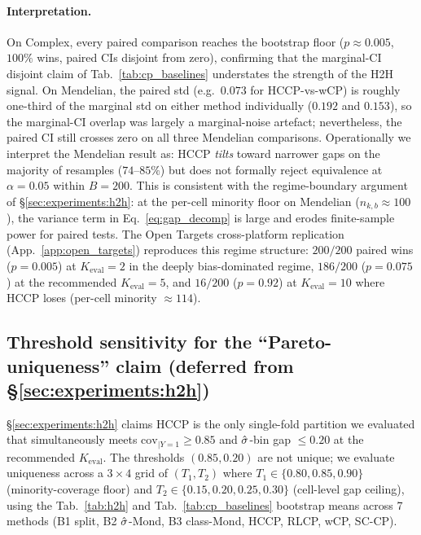\paragraph{Interpretation.} On Complex, every paired comparison reaches the bootstrap floor ($p \approx 0.005$, $100\%$ wins, paired CIs disjoint from zero), confirming that the marginal-CI disjoint claim of Tab.~\ref{tab:cp_baselines} understates the strength of the H2H signal. On Mendelian, the paired std (e.g.\ $0.073$ for HCCP-vs-wCP) is roughly one-third of the marginal std on either method individually ($0.192$ and $0.153$), so the marginal-CI overlap was largely a marginal-noise artefact; nevertheless, the paired CI still crosses zero on all three Mendelian comparisons. Operationally we interpret the Mendelian result as: HCCP \emph{tilts} toward narrower gaps on the majority of resamples ($74$--$85\%$) but does not formally reject equivalence at $\alpha = 0.05$ within $B = 200$. This is consistent with the regime-boundary argument of \S\ref{sec:experiments:h2h}: at the per-cell minority floor on Mendelian ($n_{k,b} \approx 100$), the variance term in Eq.~\eqref{eq:gap_decomp} is large and erodes finite-sample power for paired tests. The Open Targets cross-platform replication (App.~\ref{app:open_targets}) reproduces this regime structure: $200/200$ paired wins ($p = 0.005$) at $K_{\mathrm{eval}} = 2$ in the deeply bias-dominated regime, $186/200$ ($p = 0.075$) at the recommended $K_{\mathrm{eval}} = 5$, and $16/200$ ($p = 0.92$) at $K_{\mathrm{eval}} = 10$ where HCCP loses (per-cell minority $\approx 114$).

\subsection{Threshold sensitivity for the ``Pareto-uniqueness'' claim (deferred from \S\ref{sec:experiments:h2h})}
\label{app:tables:threshold_sensitivity}

\S\ref{sec:experiments:h2h} claims HCCP is the only single-fold partition we evaluated that simultaneously meets $\mathrm{cov}_{|Y=1} \geq 0.85$ and $\hat{\sigma}$-bin gap $\leq 0.20$ at the recommended $K_{\mathrm{eval}}$. The thresholds $(0.85, 0.20)$ are not unique; we evaluate uniqueness across a $3 \times 4$ grid of $(T_1, T_2)$ where $T_1 \in \{0.80, 0.85, 0.90\}$ (minority-coverage floor) and $T_2 \in \{0.15, 0.20, 0.25, 0.30\}$ (cell-level gap ceiling), using the Tab.~\ref{tab:h2h} and Tab.~\ref{tab:cp_baselines} bootstrap means across 7 methods (B1 split, B2 $\hat{\sigma}$-Mond, B3 class-Mond, HCCP, RLCP, wCP, SC-CP).

